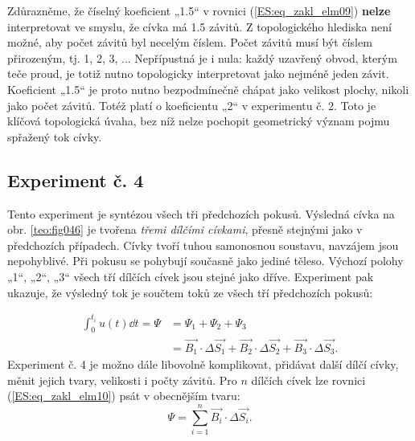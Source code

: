          Zdůrazněme, že číselný koeficient „\num{1.5}“ v rovnici (\ref{ES:eq_zakl_elm09}) 
         \textbf{nelze} interpretovat ve smyslu, že cívka má \num{1.5} závitů. Z topologického 
         hlediska není možné, aby počet závitů byl necelým číslem. Počet závitů musí být číslem 
         přirozeným, tj. 1, 2, 3, ... Nepřípustná je i nula: každý uzavřený obvod, kterým teče 
         proud, je totiž nutno topologicky interpretovat jako nejméně jeden závit. Koeficient 
         „\num{1.5}“ je proto nutno bezpodmínečně chápat jako velikost plochy, nikoli jako počet 
         závitů. Totéž platí o koeficientu „2“ v experimentu č. 2. Toto je klíčová topologická 
         úvaha, bez níž nelze pochopit geometrický význam pojmu spřažený tok cívky.
       
      \subsection{Experiment č. 4}
        Tento experiment je syntézou všech tři předchozích pokusů. Výsledná cívka na obr. 
        \ref{teo:fig046} je tvořena \emph{třemi dílčími cívkami}, přesně stejnými 
        jako v předchozích případech. Cívky tvoří tuhou samonosnou soustavu, navzájem jsou 
        nepohyblivé. Při pokusu se pohybují současně jako jediné těleso. Výchozí polohy „1“, „2“, 
        „3“ všech tří dílčích cívek jsou stejné jako dříve. Experiment pak ukazuje, že výsledný 
        tok je součtem toků ze všech tří předchozích pokusů:


        \begin{align}
          \int_0^{t_i} u(t)\dd{t} = \Psi 
            &= \Psi_1 + \Psi_2 +\Psi_3                         \nonumber \\
            &= \vec{B_1}\cdot\Delta\vec{S_1} 
             + \vec{B_2}\cdot\Delta\vec{S_2} +
               \vec{B_3}\cdot\Delta\vec{S_3}.                  \label{ES:eq_zakl_elm10}
        \end{align}
        Experiment č. 4 je možno dále libovolně komplikovat, přidávat další dílčí cívky, měnit 
        jejich tvary, velikosti i počty závitů. Pro \(n\) dílčích cívek lze rovnici 
        (\ref{ES:eq_zakl_elm10}) psát v obecnějším tvaru:
        \begin{equation}\label{ES:eq_zakl_elm11}
          \Psi = \sum_{i=1}^n\vec{B_i}\cdot\Delta\vec{S_i}.
        \end{equation}

